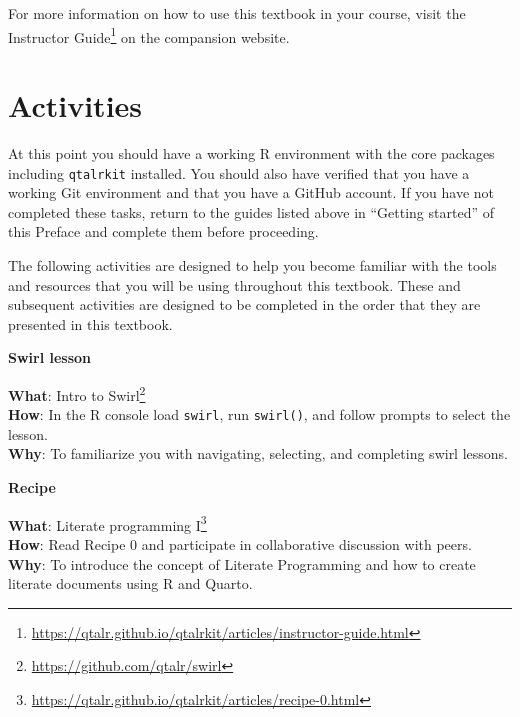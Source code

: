 \documentclass[
  letterpaper,
  DIV=11,
  numbers=noendperiod]{scrreport}
\theoremstyle{definition}
\theoremstyle{remark}
\DeclareRobustCommand{\href}[2]{#2\footnote{\url{#1}}}
\begin{document}
For more information on how to use this textbook in your course, visit
the
\href{https://qtalr.github.io/qtalrkit/articles/instructor-guide.html}{Instructor
Guide} on the compansion website.

\hypertarget{sec-p-activities}{%
\section*{Activities}\label{sec-p-activities}}


At this point you should have a working R environment with the core
packages including \texttt{qtalrkit} installed. You should also have
verified that you have a working Git environment and that you have a
GitHub account. If you have not completed these tasks, return to the
guides listed above in ``Getting started'' of this Preface and complete
them before proceeding.

The following activities are designed to help you become familiar with
the tools and resources that you will be using throughout this textbook.
These and subsequent activities are designed to be completed in the
order that they are presented in this textbook.

\begin{tcolorbox}[enhanced jigsaw, breakable, arc=.35mm, leftrule=.75mm, rightrule=.15mm, colback=white, toprule=.15mm, bottomrule=.15mm, opacityback=0, left=2mm]

\textbf{ Swirl lesson}

\textbf{What}: \href{https://github.com/qtalr/swirl}{Intro to Swirl}\\
\textbf{How}: In the R console load \texttt{swirl}, run
\texttt{swirl()}, and follow prompts to select the lesson.\\
\textbf{Why}: To familiarize you with navigating, selecting, and
completing swirl lessons.

\end{tcolorbox}

\begin{tcolorbox}[enhanced jigsaw, breakable, arc=.35mm, leftrule=.75mm, rightrule=.15mm, colback=white, toprule=.15mm, bottomrule=.15mm, opacityback=0, left=2mm]

\textbf{ Recipe}

\textbf{What}:
\href{https://qtalr.github.io/qtalrkit/articles/recipe-0.html}{Literate
programming I}\\
\textbf{How}: Read Recipe 0 and participate in collaborative discussion
with peers.\\
\textbf{Why}: To introduce the concept of Literate Programming and how
to create literate documents using R and Quarto.

\end{tcolorbox}
\end{document}
